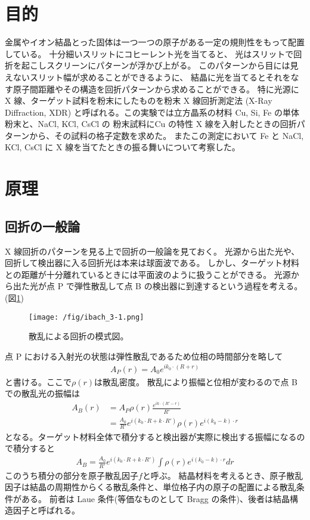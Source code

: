 \documentclass[11pt,dvipdfmx,a4paper]{jsarticle}
\begin{document}
\section{目的}
金属やイオン結晶とった固体は一つ一つの原子がある一定の規則性をもって配置している。
十分細いスリットにコヒーレント光を当てると、
光はスリットで回折を起こしスクリーンにパターンが浮かび上がる。
このパターンから目には見えないスリット幅が求めることができるように、
結晶に光を当てるとそれをなす原子間距離やその構造を回折パターンから求めることができる。
特に光源に X 線、ターゲット試料を粉末にしたものを粉末 X 線回折測定法 (X-Ray Diffraction, XDR)
と呼ばれる。この実験では立方晶系の材料 Cu, Si, Fe の単体粉末と、NaCl, KCl, CsCl の
粉末試料にCu の特性 X 線を入射したときの回折パターンから、その試料の格子定数を求めた。
またこの測定において Fe と NaCl, KCl, CsCl に X 線を当てたときの振る舞いについて考察した。

\section{原理}
\subsection{回折の一般論}
X 線回折のパターンを見る上で回折の一般論を見ておく。
光源から出た光や、回折して検出器に入る回折光は本来は球面波である。
しかし、ターゲット材料との距離が十分離れているときには平面波のように扱うことができる。
光源から出た光が点 P で弾性散乱して点 B の検出器に到達するという過程を考える。(図\ref{ibach_fig3-1})
\begin{figure}[h]
	\centering
	\texttt{[image: /fig/ibach\_3-1.png]}
	\caption{散乱による回折の模式図。\cite{ibach-luth}}
	\label{ibach_fig3-1}
\end{figure}
点 P における入射光の状態は弾性散乱であるため位相の時間部分を略して
\begin{align}
	A_P(r) = A_0e^{ik_0\cdot(R+r)}
\end{align}
と書ける。ここで\(\rho(r)\)は散乱密度。%
散乱により振幅と位相が変わるので点 B での散乱光の振幅は
\begin{align}
	A_B(r) &= A_P \rho(r) \frac{e^{ik\cdot(R'-r)}}{R'}\\
	&=\frac{A_0}{R'}e^{i(k_0 \cdot R+ k \cdot R')}\rho(r)e^{i(k_0-k)\cdot r}
\end{align}
となる。ターゲット材料全体で積分すると検出器が実際に検出する振幅になるので積分すると
\begin{align}
	A_B =\frac{A_0}{R'}e^{i(k_0 \cdot R+ k \cdot R')}\int \rho(r) e^{i(k_0-k)\cdot r} dr
\end{align}
このうち積分の部分を原子散乱因子\(f\)と呼ぶ。
結晶材料を考えるとき、原子散乱因子は結晶の周期性からくる散乱条件と、単位格子内の原子の配置による散乱条件がある。
前者は Laue 条件(等価なものとして Bragg の条件)、後者は結晶構造因子と呼ばれる。
\end{document}
